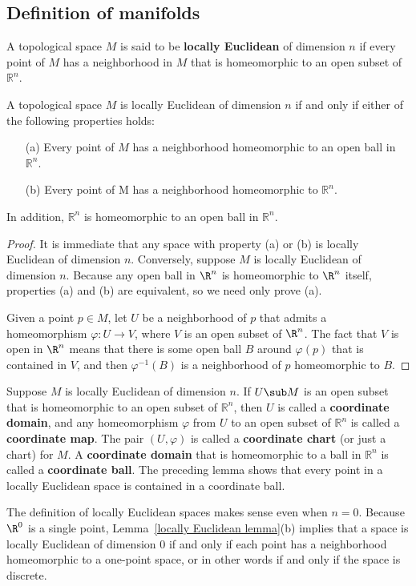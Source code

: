 \subsection{Definition of manifolds}
A topological space $M$ is said to be \textbf{locally Euclidean} of dimension $n$ if every point of $M$ has a neighborhood in $M$ that is homeomorphic to an open subset of $\mathbb{R}^n$.
\begin{lemma}\label{locally Euclidean lemma}
A topological space $M$ is locally Euclidean of dimension $n$ if and
only if either of the following properties holds:
\begin{itemize}
\item[(a)] Every point of $M$ has a neighborhood homeomorphic to an open ball in $\mathbb{R}^n$.
\item[(b)] Every point of M has a neighborhood homeomorphic to $\mathbb{R}^n$.
\end{itemize} 
In addition, $\mathbb{R}^n$ is homeomorphic to an open ball in $\mathbb{R}^n$.
\end{lemma}
\begin{proof}
It is immediate that any space with property (a) or (b) is locally Euclidean of dimension $n$. Conversely, suppose $M$ is locally Euclidean of dimension $n$. Because any open ball in $\R^n$ is homeomorphic to $\R^n$ itself, properties (a) and (b) are equivalent, so we need only prove (a).\par
Given a point $p\in M$, let $U$ be a neighborhood of $p$ that admits a homeomorphism $\varphi:U\to V$, where $V$ is an open subset of $\R^n$. The fact that $V$ is open in $\R^n$ means that there is some open ball $B$ around $\varphi(p)$ that is contained in $V$, and then $\varphi^{-1}(B)$ is a neighborhood of $p$ homeomorphic to $B$.
\end{proof}
Suppose $M$ is locally Euclidean of dimension $n$. If $U\sub M$ is an open subset that is homeomorphic to an open subset of $\mathbb{R}^n$, then $U$ is called a \textbf{coordinate domain}, and any homeomorphism $\varphi$ from $U$ to an open subset of $\mathbb{R}^n$ is called a \textbf{coordinate map}. The pair $(U,\varphi)$ is called a \textbf{coordinate chart} (or just a chart) for $M$. A \textbf{coordinate domain} that is homeomorphic to a ball in $\mathbb{R}^n$ is called a \textbf{coordinate ball}. The preceding lemma shows that every point in a locally Euclidean space is contained in a coordinate ball.\par
The definition of locally Euclidean spaces makes sense even when $n=0$. Because $\R^0$ is a single point, Lemma~\ref{locally Euclidean lemma}(b) implies that a space is locally Euclidean of dimension $0$ if and only if each point has a neighborhood homeomorphic to a one-point space, or in other words if and only if the space is discrete.
